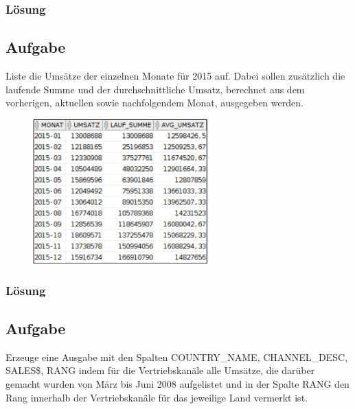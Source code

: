 \subsubsection*{Lösung}
\label{subsubsec:uebung_07.aufgabe_03.loesung}


\subsection{Aufgabe}
\label{subsec:uebung_07.aufgabe_04}
Liste die Umsätze der einzelnen Monate für 2015 auf. Dabei sollen zusätzlich die laufende Summe und der durchschnittliche Umsatz, berechnet aus dem vorherigen, aktuellen sowie nachfolgendem Monat, ausgegeben werden.

\begin{figure}[H]
  \centering
  \includegraphics[width=0.6\textwidth]{img//uebung_07_-_aufgabe_04.png}
  \label{img:uebung_07_-_aufgabe_04}
\end{figure}

\subsubsection*{Lösung}
\label{subsubsec:uebung_07.aufgabe_04.loesung}


\subsection{Aufgabe}
\label{subsec:uebung_07.aufgabe_05}
Erzeuge eine Ausgabe mit den Spalten COUNTRY\_NAME, CHANNEL\_DESC, SALES\$, RANG indem für die Vertriebskanäle alle Umsätze, die darüber gemacht wurden von März bis Juni 2008 aufgelistet und in der Spalte RANG den Rang innerhalb der Vertriebskanäle für das jeweilige Land vermerkt ist.


